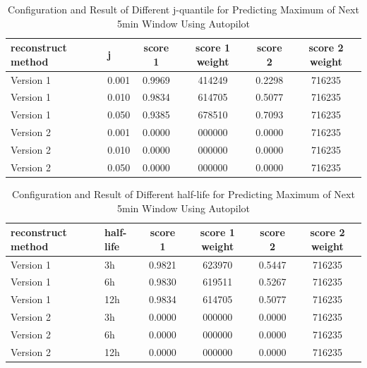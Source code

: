 \documentclass{article}
\begin{document}
\begin{table}[htbp]
  \begin{center}
    \caption{Configuration and Result of Different j-quantile for Predicting Maximum of Next 5min Window Using Autopilot}
    \label{tab:tab1.11.1}
    \begin{tabular}{l|l|*{4}{c}}
      \textbf{reconstruct method} & \textbf{j} & \textbf{score 1} & \textbf{score 1 weight} & \textbf{score 2} & \textbf{score 2 weight} \\
      \hline
      Version 1 & 0.001 & 0.9969 & 414249 & 0.2298 & 716235\\
      Version 1 & 0.010 & 0.9834 & 614705 & 0.5077 & 716235\\
      Version 1 & 0.050 & 0.9385 & 678510 & 0.7093 & 716235\\
      Version 2 & 0.001 & 0.0000 & 000000 & 0.0000 & 716235\\
      Version 2 & 0.010 & 0.0000 & 000000 & 0.0000 & 716235\\
      Version 2 & 0.050 & 0.0000 & 000000 & 0.0000 & 716235\\
    \end{tabular}
  \end{center}
\end{table}

\begin{table}[htbp]
  \begin{center}
    \caption{Configuration and Result of Different half-life for Predicting Maximum of Next 5min Window Using Autopilot}
    \label{tab:tab1.11.2}
    \begin{tabular}{l|l|*{4}{c}}
      \textbf{reconstruct method} & \textbf{half-life} & \textbf{score 1} & \textbf{score 1 weight} & \textbf{score 2} & \textbf{score 2 weight} \\
      \hline
      Version 1 & 3h & 0.9821 & 623970 & 0.5447 & 716235\\
      Version 1 & 6h & 0.9830 & 619511 & 0.5267 & 716235\\
      Version 1 & 12h & 0.9834 & 614705 & 0.5077 & 716235\\
      Version 2 & 3h & 0.0000 & 000000 & 0.0000 & 716235\\
      Version 2 & 6h & 0.0000 & 000000 & 0.0000 & 716235\\
      Version 2 & 12h & 0.0000 & 000000 & 0.0000 & 716235\\
    \end{tabular}
  \end{center}
\end{table}
\end{document}
